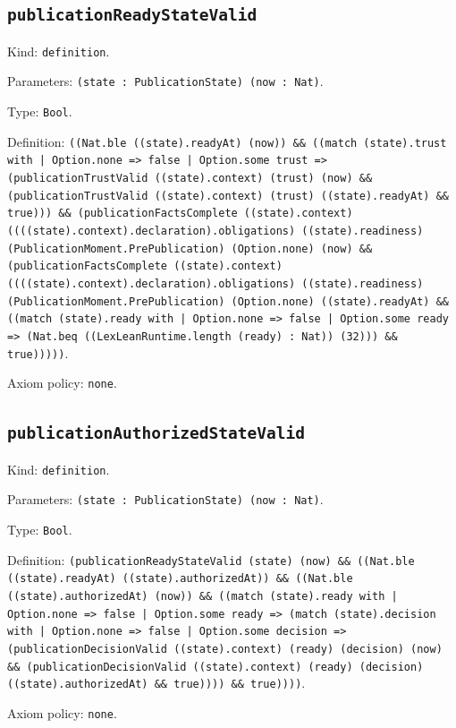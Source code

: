 \documentclass[11pt]{article}
\begin{document}
\subsection*{\texttt{publicationReadyStateValid}}
\noindent Kind: \texttt{definition}.\par
\noindent Parameters: \texttt{(state : PublicationState) (now : Nat)}.\par
\noindent Type: \texttt{Bool}.\par
\noindent Definition: \texttt{((Nat.ble ((state).readyAt) (now)) \&\& ((match (state).trust with | Option.none => false | Option.some trust => (publicationTrustValid ((state).context) (trust) (now) \&\& (publicationTrustValid ((state).context) (trust) ((state).readyAt) \&\& true))) \&\& (publicationFactsComplete ((state).context) ((((state).context).declaration).obligations) ((state).readiness) (PublicationMoment.PrePublication) (Option.none) (now) \&\& (publicationFactsComplete ((state).context) ((((state).context).declaration).obligations) ((state).readiness) (PublicationMoment.PrePublication) (Option.none) ((state).readyAt) \&\& ((match (state).ready with | Option.none => false | Option.some ready => (Nat.beq ((LexLeanRuntime.length (ready) : Nat)) (32))) \&\& true)))))}.\par
\noindent Axiom policy: \texttt{none}.\par
\subsection*{\texttt{publicationAuthorizedStateValid}}
\noindent Kind: \texttt{definition}.\par
\noindent Parameters: \texttt{(state : PublicationState) (now : Nat)}.\par
\noindent Type: \texttt{Bool}.\par
\noindent Definition: \texttt{(publicationReadyStateValid (state) (now) \&\& ((Nat.ble ((state).readyAt) ((state).authorizedAt)) \&\& ((Nat.ble ((state).authorizedAt) (now)) \&\& ((match (state).ready with | Option.none => false | Option.some ready => (match (state).decision with | Option.none => false | Option.some decision => (publicationDecisionValid ((state).context) (ready) (decision) (now) \&\& (publicationDecisionValid ((state).context) (ready) (decision) ((state).authorizedAt) \&\& true)))) \&\& true))))}.\par
\noindent Axiom policy: \texttt{none}.\par
\end{document}
